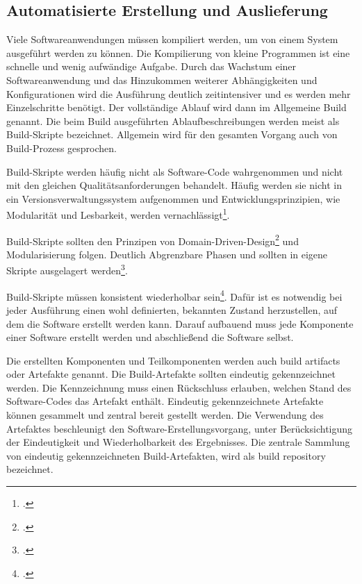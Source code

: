 \subsection{Automatisierte Erstellung und Auslieferung}

Viele Softwareanwendungen müssen kompiliert werden, um von einem System ausgeführt werden zu können. Die Kompilierung von kleine Programmen ist eine schnelle und wenig aufwändige Aufgabe. Durch das Wachstum einer Softwareanwendung und das Hinzukommen weiterer Abhängigkeiten und Konfigurationen wird die Ausführung deutlich zeitintensiver und es werden mehr Einzelschritte benötigt. Der vollständige Ablauf wird dann im Allgemeine \glqq Build\grqq{} genannt. Die beim Build ausgeführten Ablaufbeschreibungen werden meist als Build-Skripte bezeichnet. Allgemein wird für den gesamten Vorgang auch von Build-Prozess gesprochen.

Build-Skripte werden häufig nicht als Software-Code wahrgenommen und nicht mit den gleichen Qualitätsanforderungen behandelt. Häufig werden sie nicht in ein Versionsverwaltungssystem aufgenommen und Entwicklungsprinzipien, wie Modularität und Lesbarkeit, werden vernachlässigt\footcite[vgl.][Kap. Build and Deployment Scripting]{humble2010}.

Build-Skripte sollten den Prinzipen von Domain-Driven-Design\footcite[vgl.][The Building Blocks of a Model-Driven Design]{evans-domain-driven} und Modularisierung folgen. Deutlich Abgrenzbare Phasen und sollten in eigene Skripte ausgelagert werden\footcite[vgl.][Kap. Principles and Practices of Build and Deployment Scripting]{humble2010}.

Build-Skripte müssen konsistent wiederholbar sein\footcite[vgl.][Sektion: Ensure the Deployment Process Is Idempotent]{humble2010}. Dafür ist es notwendig bei jeder Ausführung einen wohl definierten, bekannten Zustand herzustellen, auf dem die Software erstellt werden kann. Darauf aufbauend muss jede Komponente einer Software erstellt werden und abschließend die Software selbst.

Die erstellten Komponenten und Teilkomponenten werden auch \glqq build artifacts\grqq{} oder Artefakte genannt. Die Build-Artefakte sollten eindeutig gekennzeichnet werden. Die Kennzeichnung muss einen Rückschluss erlauben, welchen Stand des Software-Codes das Artefakt enthält. 
Eindeutig gekennzeichnete Artefakte können gesammelt und zentral bereit gestellt werden. Die Verwendung des Artefaktes beschleunigt den Software-Erstellungsvorgang, unter Berücksichtigung der Eindeutigkeit und Wiederholbarkeit des Ergebnisses. 
Die zentrale Sammlung von eindeutig gekennzeichneten Build-Artefakten, wird als \glqq build repository\grqq{} bezeichnet.

